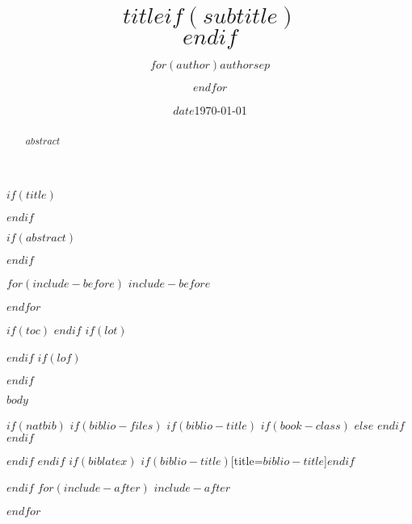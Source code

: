 \documentclass[$if(fontsize)$$fontsize$,$endif$$if(lang)$$lang$,$endif$$if(papersize)$$papersize$,$endif$$for(classoption)$$classoption$$sep$,$endfor$]{$documentclass$}
\title{\huge $title$$if(subtitle)$\\\vspace{0.5em}{\large $subtitle$}$endif$\vspace{13cm}}
\author{$for(author)$$author$$sep$ \and $endfor$}
\date{\hfill $date$}
\date{\hfill \today}
\begin{document}
$if(title)$
{\let\newpage\relax\maketitle}
$endif$

\renewcommand{\contentsname}{目\qquad 录}
\newpage
\tableofcontents
\thispagestyle{empty}
\newpage

$if(abstract)$
\begin{abstract}
$abstract$
\end{abstract}
$endif$

$for(include-before)$
$include-before$

$endfor$


$if(toc)$
{
\hypersetup{linkcolor=black}
\setcounter{tocdepth}{$toc-depth$}
\tableofcontents
}
$endif$
$if(lot)$
\listoftables
$endif$
$if(lof)$
\listoffigures
$endif$

$body$

$if(natbib)$
$if(biblio-files)$
$if(biblio-title)$
$if(book-class)$
\renewcommand\bibname{$biblio-title$}
$else$
\renewcommand\refname{$biblio-title$}
$endif$
$endif$


$endif$
$endif$
$if(biblatex)$
\printbibliography$if(biblio-title)$[title=$biblio-title$]$endif$

$endif$
$for(include-after)$
$include-after$

$endfor$
\end{document}
